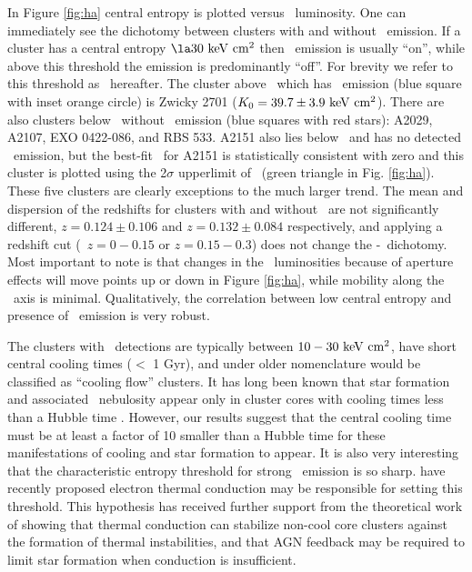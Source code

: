 \documentclass[12pt,preprint]{aastex}
\begin{document}
In Figure \ref{fig:ha} central entropy is plotted versus
\halpha\ luminosity. One can immediately see the dichotomy between
clusters with and without \halpha\ emission. If a cluster has a
central entropy $\la 30 \ent$ then \halpha\ emission is usually
``on'', while above this threshold the emission is predominantly
``off''. For brevity we refer to this threshold as
\kthr\ hereafter. The cluster above \kthr\ which has \halpha\ emission
(blue square with inset orange circle) is Zwicky 2701 ($K_0 = 39.7
\pm 3.9 \mathrm{\mbox{\ensuremath{\mathrm{~keV}}} \mathrm{\mbox{\ensuremath{\mathrm{~cm}}}^2}}$). There are also clusters below \kthr\ without
\halpha\ emission (blue squares with red stars): A2029, A2107, EXO
0422-086, and RBS 533. A2151 also lies below \kthr\ and has no
detected \halpha\ emission, but the best-fit \kna\ for A2151 is
statistically consistent with zero and this cluster is plotted using
the 2$\sigma$ upperlimit of \kna\ (green triangle in
Fig. \ref{fig:ha}).  These five clusters are clearly exceptions to the
much larger trend. The mean and dispersion of the redshifts for
clusters with and without \halpha\ are not significantly different,
$z = 0.124 \pm 0.106$ and $z = 0.132 \pm 0.084$ respectively, and
applying a redshift cut (\ie\ $z = 0-0.15$ or $z = 0.15-0.3$) does not
change the \kna-\halpha\ dichotomy. Most important to note is that
changes in the \halpha\ luminosities because of aperture effects will
move points up or down in Figure \ref{fig:ha}, while mobility along
the \kna\ axis is minimal. Qualitatively, the correlation between low
central entropy and presence of \halpha\ emission is very robust.

The clusters with \halpha\ detections are typically between $10-30
\mathrm{\mbox{\ensuremath{\mathrm{~keV}}} \mathrm{\mbox{\ensuremath{\mathrm{~cm}}}^2}}$, have short central cooling times ($<$ 1 Gyr), and under older
nomenclature would be classified as ``cooling flow'' clusters.  It has
long been known that star formation and associated \halpha\ nebulosity
appear only in cluster cores with cooling times less than a Hubble
time \citep{hu85, johnstone87, mcnamara89, voit97,cardiel98}. However,
our results suggest that the central cooling time must be at least a
factor of 10 smaller than a Hubble time for these manifestations of
cooling and star formation to appear.  It is also very interesting
that the characteristic entropy threshold for strong \halpha\ emission
is so sharp. \cite{conduction} have recently proposed electron thermal
conduction may be responsible for setting this threshold. This
hypothesis has received further support from the theoretical work of
\cite{2008arXiv0804.3823G} showing that thermal conduction can
stabilize non-cool core clusters against the formation of thermal
instabilities, and that AGN feedback may be required to limit star
formation when conduction is insufficient.
\end{document}
